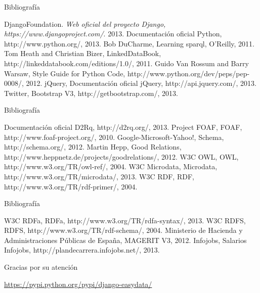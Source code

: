 \documentclass[spanish,xcolor=table,svgnames]{beamer}
\begin{document}
\begin{frame}{Bibliografí­a}
  \begin{thebibliography}{10}
    \beamertemplatebookbibitems
     DjangoFoundation. \emph{Web oficial del proyecto Django, https://www.djangoproject.com/}. 2013.
     Documentación oficial Python, http://www.python.org/, 2013.
     Bob DuCharme, Learning sparql, O'Reilly, 2011.
     Tom Heath and Christian Bizer, LinkedDataBook, http://linkeddatabook.com/editions/1.0/, 2011.
     Guido Van Rossum and Barry Warsaw, Style Guide for Python Code, http://www.python.org/dev/peps/pep-0008/, 2012.
     jQuery, Documentación oficial jQuery, http://api.jquery.com/, 2013.
     Twitter, Bootstrap V3, http://getbootstrap.com/, 2013.
  \end{thebibliography} 
\end{frame}

\begin{frame}{Bibliografí­a}
  \begin{thebibliography}{10}
    \beamertemplatebookbibitems
     Documentación oficial D2Rq, http://d2rq.org/, 2013.
     Project FOAF, FOAF, http://www.foaf-project.org/, 2010.
     Google-Microsoft-Yahoo!, Schema, http://schema.org/, 2012.
     Martin Hepp, Good Relations, http://www.heppnetz.de/projects/goodrelations/, 2012.
     W3C OWL, OWL, http://www.w3.org/TR/owl-ref/, 2004.
     W3C Microdata, Microdata, http://www.w3.org/TR/microdata/, 2013.
     W3C RDF, RDF, http://www.w3.org/TR/rdf-primer/, 2004.
  \end{thebibliography} 
\end{frame}

\begin{frame}{Bibliografí­a}
  \begin{thebibliography}{10}
    \beamertemplatebookbibitems
     W3C RDFa, RDFa, http://www.w3.org/TR/rdfa-syntax/, 2013.
     W3C RDFS, RDFS, http://www.w3.org/TR/rdf-schema/, 2004.
     Ministerio de Hacienda y Administraciones Públicas de España, MAGERIT V3, 2012.
     Infojobs, Salarios Infojobs, http://plandecarrera.infojobs.net/, 2013.
  \end{thebibliography} 
\end{frame}


\appendix
\frame
{
  \begin{center}
    \Huge{Gracias por su atención}
  \end{center}
  \begin{center}
    \url{https://pypi.python.org/pypi/django-easydata/}
  \end{center}
}
\end{document}
